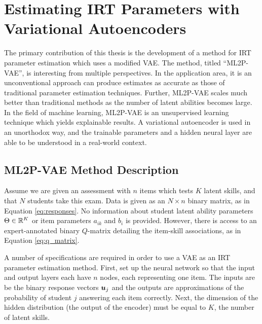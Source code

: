 \chapter{Estimating IRT Parameters with Variational Autoencoders}
The primary contribution of this thesis is the development of a method for IRT parameter estimation which uses a modified VAE. The method, titled ``ML2P-VAE'', is interesting from multiple perspectives. In the application area, it is an unconventional approach can produce estimates as accurate as those of traditional parameter estimation techniques. Further, ML2P-VAE scales much better than traditional methods as the number of latent abilities becomes large. In the field of machine learning, ML2P-VAE is an unsupervised learning technique which yields explainable results. A variational autoencoder is used in an unorthodox way, and the trainable parameters and a hidden neural layer are able to be understood in a real-world context.

\section{ML2P-VAE Method Description}
Assume we are given an assessment with $n$ items which tests $K$ latent skills, and that $N$ students take this exam. Data is given as an $N \times n$ binary matrix, as in Equation \ref{eq:responses}. No information about student latent ability parameters $\Theta \in \mathbb{R}^K$ or item parameters $a_{ik}$ and $b_i$ is provided. However, there is access to an expert-annotated binary $Q$-matrix detailing the item-skill associations, as in Equation \ref{eq:q_matrix}.

A number of specifications are required in order to use a VAE as an IRT parameter estimation method. First, set up the neural network so that the input and output layers each have $n$ nodes, each representing one item. The inputs are be the binary response vectors $\boldsymbol{u}_j$ and the outputs are approximations of the probability of student $j$ answering each item correctly. Next, the dimension of the hidden distribution (the output of the encoder) must be equal to $K$, the number of latent skills.


